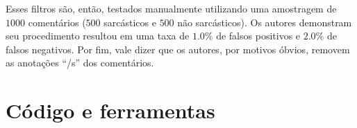 Esses filtros são, então, testados manualmente utilizando uma amostragem de
$1000$ comentários ($500$ sarcásticos e $500$ não sarcásticos). Os autores
demonstram seu procedimento resultou em uma taxa de $1.0\%$ de falsos positivos
e $2.0\%$ de falsos negativos. Por fim, vale dizer que os autores, por motivos
óbvios, removem as anotações ``/s'' dos comentários.

\section{Código e ferramentas}%
\label{sec:codigo_e_ferramentas}



